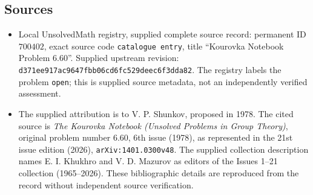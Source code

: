 \documentclass[11pt]{article}
\begin{document}
\subsection{Sources}
\begin{itemize}
\item Local UnsolvedMath registry, supplied complete source record: permanent ID \(700402\), exact source code \texttt{catalogue entry}, title ``Kourovka Notebook Problem 6.60''. Supplied upstream revision: \texttt{d371ee917ac9647fbb06cd6fc529deec6f3dda82}. The registry labels the problem \texttt{open}; this is supplied source metadata, not an independently verified assessment.
\item The supplied attribution is to V. P. Shunkov, proposed in 1978. The cited source is \emph{The Kourovka Notebook (Unsolved Problems in Group Theory)}, original problem number 6.60, 6th issue (1978), as represented in the 21st issue edition (2026), \texttt{arXiv:1401.0300v48}. The supplied collection description names E. I. Khukhro and V. D. Mazurov as editors of the Issues 1--21 collection (1965--2026). These bibliographic details are reproduced from the record without independent source verification.
\end{itemize}
\end{document}
